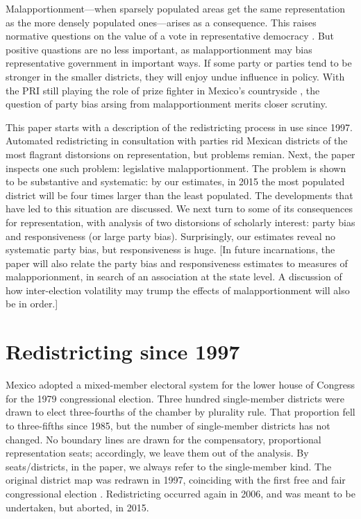 \documentclass[letter,12pt]{article}
\begin{document}
Malapportionment---when sparsely populated areas get the same representation as the more densely populated ones---arises as a consequence. This raises normative questions on the value of a vote in representative democracy \citep{cox.1987,balinskiYoung2001FairRep,dahl.1972}. But positive quastions are no less important, as malapportionment may bias representative government in important ways. If some party or parties tend to be stronger in the smaller districts, they will enjoy undue influence in policy. With the PRI still playing the role of prize fighter in Mexico's countryside \citep{amesMex.1970,magar.1994}, the question of party bias arsing from malapportionment merits closer scrutiny. 

This paper starts with a description of the redistricting process in use since 1997. Automated redistricting in consultation with parties rid Mexican districts of the most flagrant distorsions on representation, but problems remian. Next, the paper inspects one such problem: legislative malapportionment. The problem is shown to be substantive and systematic: by our estimates, in 2015 the most populated district will be four times larger than the least populated. The developments that have led to this situation are discussed. We next turn to some of its consequences for representation, with analysis of two distorsions of scholarly interest: party bias and responsiveness (or large party bias). Surprisingly, our estimates reveal no systematic party bias, but responsiveness is huge. [In future incarnations, the paper will also relate the party bias and responsiveness estimates to measures of malapporionment, in search of an association at the state level. A discussion of how inter-election volatility may trump the effects of malapportionment will also be in order.]

\section{Redistricting since 1997}

Mexico adopted a mixed-member electoral system for the lower house of Congress for the 1979 congressional election. Three hundred single-member districts were drawn to elect three-fourths of the chamber by plurality rule. That proportion fell to three-fifths since 1985, but the number of single-member districts has not changed. No boundary lines are drawn for the compensatory, proportional representation seats; accordingly, we leave them out of the analysis. By seats/districts, in the paper, we always refer to the single-member kind. The original district map was redrawn in 1997, coinciding with the first free and fair congressional election \citep{lujambio.vives.2008}. Redistricting occurred again in 2006, and was meant to be undertaken, but aborted, in 2015. 
\end{document}
